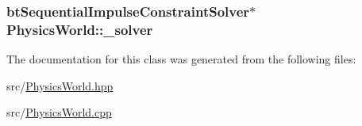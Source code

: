 \subsubsection[{\texorpdfstring{\+\_\+solver}{_solver}}]{\setlength{\rightskip}{0pt plus 5cm}bt\+Sequential\+Impulse\+Constraint\+Solver$\ast$ Physics\+World\+::\+\_\+solver\hspace{0.3cm}{\ttfamily [private]}}\hypertarget{classPhysicsWorld_ae1c6ec226d583fe9812cae7f00fe5b1f}{}\label{classPhysicsWorld_ae1c6ec226d583fe9812cae7f00fe5b1f}


The documentation for this class was generated from the following files\+:\begin{DoxyCompactItemize}
\item 
src/\hyperlink{PhysicsWorld_8hpp}{Physics\+World.\+hpp}\item 
src/\hyperlink{PhysicsWorld_8cpp}{Physics\+World.\+cpp}\end{DoxyCompactItemize}
